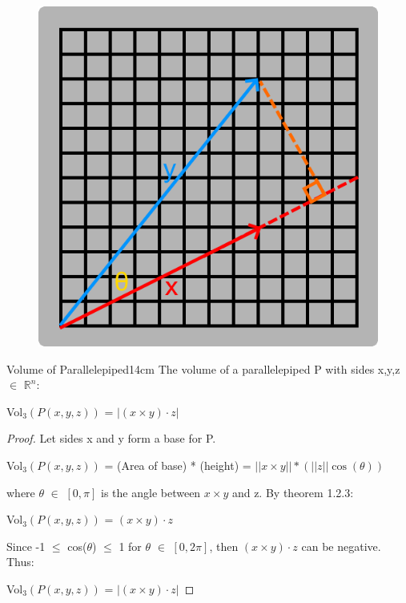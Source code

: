     \begin{figure}[h]
        \centering
        \includegraphics[scale=0.4]{Images/1.3.5.png}        
    \end{figure}



    \begin{wtheorem}{Volume of Parallelepiped}{14cm}
        The volume of a parallelepiped P with sides x,y,z $\in$ $\mathbb{R}^n$:

        \hspace{0.5cm}
        Vol$_3(P(x,y,z))$
        = $|(x \times y) \cdot z|$
    \end{wtheorem}

    \begin{proof}
        Let sides x and y form a base for P.

        \hspace{0.5cm}
        Vol$_3(P(x,y,z))$
        = (Area of base) * (height)
        = $||x \times y|| * (||z|| \cos(\theta))$

        where $\theta$ $\in$ $[0,\pi]$ is the angle between $x \times y$
        and z. By {\color{red} theorem 1.2.3}:

        \hspace{0.5cm}
        Vol$_3(P(x,y,z))$ = $(x \times y) \cdot z$

        Since -1 $\leq$ cos($\theta$) $\leq$ 1 for $\theta$ $\in$ $[0,2\pi]$, then
        $(x \times y) \cdot z$ can be negative. Thus:

        \hspace{0.5cm}
        Vol$_3(P(x,y,z))$ = $|(x \times y) \cdot z|$
    \end{proof}


